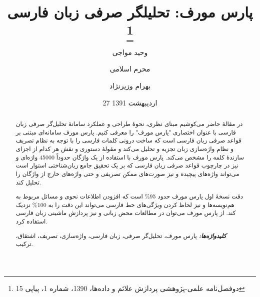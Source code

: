 \documentclass[12pt,onecolumn,a4paper]{article}
\providecommand{\keywords}[1]{\textbf{\textit{کلیدواژه‌ها:}} #1}
\begin{document}
    \title{پارس مورف: تحلیلگر صرفی زبان فارسی \footnote{دوفصل‌نامه علمی-پژوهشی پردازش علائم و داده‌ها، 1390، شماره 1، پیاپی 15}}
    \author[1]{وحید مواجی}
    \author[2]{محرم اسلامی}
    \author[1]{بهرام وزیرنژاد}
    \date{27 اردیبهشت 1391}
    \maketitle

    \begin{abstract}
        در مقالهٔ حاضر می‌کوشیم مبنای نظری، نحوهٔ طراحی و عملکرد سامانهٔ تحلیل‌گر صرفی زبان فارسی با عنوان اختصاری "پارس مورف" را معرفی کنیم. پارس مورف سامانه‌ای مبتنی بر قواعد صرفی زبان فارسی است که ساخت درونی کلمات فارسی را با توجه به نظام تصریف و نظام واژه‌سازی زبان تجزیه و تحلیل می‌کند و مقولهٔ دستوری و نقش هر کدام از اجزای سازندهٔ کلمه را مشخص می‌کند. پارس مورف با استفاده از یک واژگان حدوداً 45000 واژه‌‌ای و نیز در چارچوب قواعد صرفی زبان فارسی که بر یک تحقیق جامع زبان‌شناختی استوار است می‌تواند واژه‌های پیچیده و نیز صورت‌های ممکن تصریفی و حتی واژه‌های خارج از واژگان را تحلیل کند.
        \par
        دقت نسخهٔ اول پارس مورف حدود 95\% است که افزودن اطلاعات نحوی و مسائل مربوط به هم‌نویسه‌ها و نیز لحاظ کردن ویژگی‌های خط فارسی می‌تواند این دقت را به 100\% نزدیک کند. از پارس مورف می‌توان در مطالعات محض زبانی و نیز پردازش ماشینی زبان فارسی استفاده کرد.
        \par
        \keywords{ پارس مورف، تحلیل‌گر صرفی، زبان فارسی، واژه‌سازی، تصریف، اشتقاق، ترکیب.}
    \end{abstract}
\end{document}
